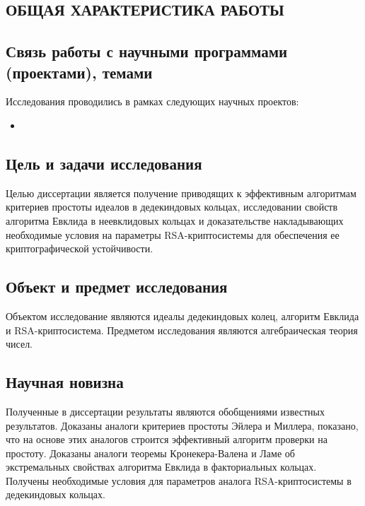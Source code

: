\documentclass[_00_dissertation.tex]{subfiles}
\begin{document}
\onlyinsubfile{
    \renewcommand{\contentsname}{ОГЛАВЛЕНИЕ}
    \setcounter{tocdepth}{3}
    \tableofcontents
}


\begin{center}
    \chapter*{ОБЩАЯ ХАРАКТЕРИСТИКА РАБОТЫ}
\end{center}

\section*{Связь работы с научными программами (проектами), темами}

Исследования проводились в рамках следующих научных проектов:
\begin{itemize}
    \item 
\end{itemize}

\section*{Цель и задачи исследования}

Целью диссертации является получение приводящих к эффективным алгоритмам критериев простоты идеалов в дедекиндовых кольцах, исследовании свойств алгоритма Евклида в неевклидовых кольцах и доказательстве накладывающих необходимые условия на параметры RSA-криптосистемы для обеспечения ее криптографической устойчивости.

\section*{Объект и предмет исследования}

Объектом исследование являются идеалы дедекиндовых колец, алгоритм Евклида и RSA-криптосистема.
Предметом исследования являются алгебраическая теория чисел.

\section*{Научная новизна}

Полученные в диссертации результаты являются обобщениями известных результатов.
Доказаны аналоги критериев простоты Эйлера и Миллера, показано, что на основе этих аналогов строится эффективный алгоритм проверки на простоту.
Доказаны аналоги теоремы Кронекера-Валена и Ламе об экстремальных свойствах алгоритма Евклида в факториальных кольцах.
Получены необходимые условия для параметров аналога RSA-криптосистемы в дедекиндовых кольцах.
\end{document}
